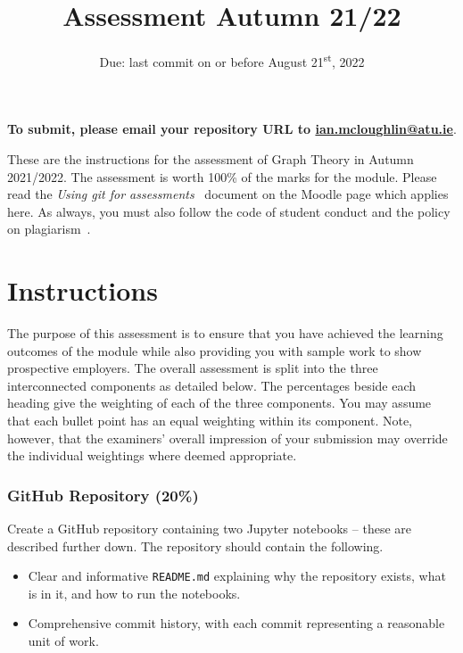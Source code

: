 \documentclass[a4paper, 12pt]{scrartcl}
\title{Assessment Autumn 21/22}
\author{}
\date{Due: last commit on or before August 21\textsuperscript{st}, 2022}
\begin{document}
  
  \maketitle
  
  \vspace{-12mm}
  \begin{center} \textbf{To submit, please email your repository URL to \url{ian.mcloughlin@atu.ie}}. \end{center}


  \noindent These are the instructions for the assessment of Graph Theory in Autumn 2021/2022.
  The assessment is worth 100\% of the marks for the module.
  Please read the \emph{Using git for assessments}~\cite{usinggit} document on the Moodle page which applies here.
  As always, you must also follow the code of student conduct and the policy on plagiarism~\cite{gmitqaf}.

  \section*{Instructions}
  
  The purpose of this assessment is to ensure that you have achieved the learning outcomes of the module while also providing you with sample work to show prospective employers.
  The overall assessment is split into the three interconnected components as detailed below.
  The percentages beside each heading give the weighting of each of the three components.
  You may assume that each bullet point has an equal weighting within its component.
  Note, however, that the examiners' overall impression of your submission may override the individual weightings where deemed appropriate.

  \subsubsection*{GitHub Repository (20\%)}
  Create a GitHub repository containing two Jupyter notebooks -- these are described further down.
  The repository should contain the following.
  \begin{itemize}
    \item Clear and informative \texttt{README.md} explaining why the repository exists, what is in it, and how to run the notebooks.
    \item Comprehensive commit history, with each commit representing a reasonable unit of work.
  \end{itemize}
\end{document}
